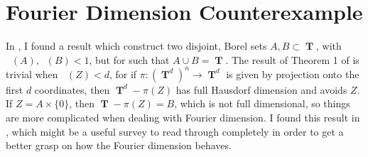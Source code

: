 \documentclass[nobib,nols,a4paper,twoside,symmetric,justified,notoc]{tufte-book}
\DeclareMathOperator{\TT}{\mathbf{T}}
\DeclareMathOperator{\fordim}{\text{dim}_{\mathbf{F}}}
\DeclareMathOperator{\minkdim}{\text{dim}_{\mathbf{M}}}
\begin{document}
\section{Fourier Dimension Counterexample}

In \cite{Ekstrom2014}, I found a result which construct two disjoint, Borel sets $A, B \subset \TT$, with $\fordim(A), \fordim(B) < 1$, but for such that $A \cup B = \TT$. The result of Theorem 1 of \cite{Denson2019} is trivial when $\minkdim(Z) < d$, for if $\pi: (\TT^d)^n \to \TT^d$ is given by projection onto the first $d$ coordinates, then $\TT^d - \pi(Z)$ has full Hausdorf dimension and avoids $Z$. If $Z = A \times \{ 0 \}$, then $\TT - \pi(Z) = B$, which is not full dimensional, so things are more complicated when dealing with Fourier dimension. I found this result in \cite{Ekstrom2017}, which might be a useful survey to read through completely in order to get a better grasp on how the Fourier dimension behaves.
\end{document}
